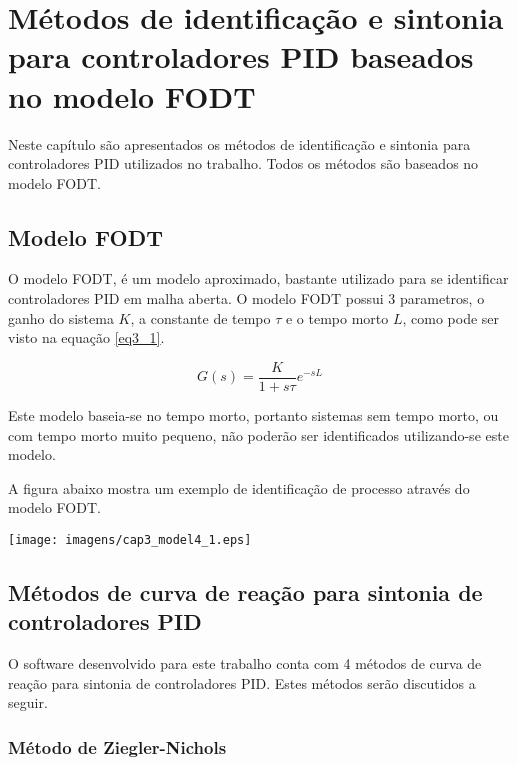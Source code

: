 \chapter{Métodos de identificação e sintonia para controladores PID
    baseados no modelo FODT \label{cap:metodos-de-identificacao-e-sintonia}}

Neste capítulo são apresentados os métodos de identificação e sintonia
para controladores PID utilizados no trabalho. Todos os métodos são
baseados no modelo FODT.

\section{Modelo FODT}

    O modelo \ac{FODT}, é um modelo aproximado, bastante utilizado para se
    identificar controladores \acs{PID} em malha aberta. O modelo \acs{FODT}
    possui 3 parametros, o ganho do sistema $K$, a constante de tempo $\tau$
    e o tempo morto $L$, como pode ser visto na equação \ref{eq3_1}.

    \begin{equation}
        G(s) = \frac{K}{1 + s\tau} e^{-sL}
        \label{eq3_1}
    \end{equation}

    Este modelo baseia-se no tempo morto, portanto sistemas sem tempo morto,
    ou com tempo morto muito pequeno, não poderão ser identificados utilizando-se
    este modelo.

    A figura abaixo mostra um exemplo de identificação de processo através
    do modelo \ac{FODT}.

    \begin{center}
        \texttt{[image: imagens/cap3\_model4\_1.eps]}
    \end{center}

\section{Métodos de curva de reação para sintonia de controladores PID}

    O software desenvolvido para este trabalho conta com 4 métodos de
    curva de reação para sintonia de controladores \acs{PID}. Estes métodos
    serão discutidos a seguir.
    
    \subsection{Método de Ziegler-Nichols}
        
